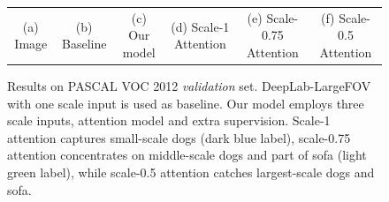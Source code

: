 \begin{figure}
{\begin{tabular}{c c c c c c}
   {\scriptsize (a) Image} & 
   {\scriptsize (b) Baseline} & 
   {\scriptsize (c) Our model} & 
   {\scriptsize (d) Scale-1 Attention} & 
   {\scriptsize (e) Scale-0.75 Attention} &
   {\scriptsize (f) Scale-0.5 Attention} \\
  \end{tabular}
  }
  \vspace{1pt}
  \caption{Results on PASCAL VOC 2012 {\it validation} set. DeepLab-LargeFOV with one scale input is used as baseline. Our model employs three scale inputs, attention model and extra supervision. Scale-1 attention captures small-scale dogs (dark blue label), scale-0.75 attention concentrates on middle-scale dogs and part of sofa (light green label), while scale-0.5 attention catches largest-scale dogs and sofa.} 
  \label{fig:pascal_voc12_results}  
\end{figure}


